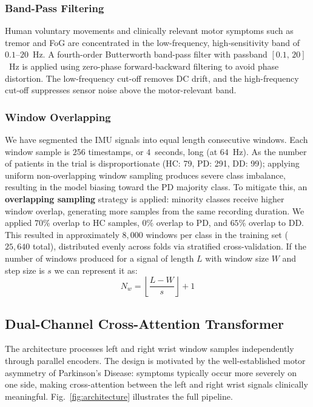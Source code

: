 \documentclass[conference]{IEEEtran}
\begin{document}
\subsubsection{Band-Pass Filtering}
Human voluntary movements and clinically relevant motor symptoms such as tremor and FoG are concentrated in the low-frequency, high-sensitivity band of $0.1$--$20$~Hz. A fourth-order Butterworth band-pass filter with passband $[0.1,\,20]$~Hz is applied using zero-phase forward-backward filtering to avoid phase distortion. The low-frequency cut-off removes DC drift, and the high-frequency cut-off suppresses sensor noise above the motor-relevant band.

\subsubsection{Window Overlapping}
\label{sec:windowing}
We have segmented the IMU signals into equal length consecutive windows. Each window sample is $256$ timestamps, or $4$~seconds, long (at $64$~Hz). As the number of patients in the trial is disproportionate (HC: 79, PD: 291, DD: 99); applying uniform non-overlapping window sampling produces severe class imbalance, resulting in the model biasing toward the PD majority class. To mitigate this, an \textbf{overlapping sampling} strategy is applied: minority classes receive higher window overlap, generating more samples from the same recording duration. We applied $70$\% overlap to HC samples, $0$\% overlap to PD, and $65$\% overlap to DD. This resulted in approximately $8{,}000$ windows per class in the training set ($25{,}640$ total), distributed evenly across folds via stratified cross-validation. If the number of windows produced for a signal of length $L$ with window size $W$ and step size is $s$  we can represent it as:
\begin{equation}
  N_w = \left\lfloor \frac{L - W}{s} \right\rfloor + 1
\end{equation}

\subsection{Dual-Channel Cross-Attention Transformer}
\label{sec:base_model}
The architecture processes left and right wrist window samples independently through parallel encoders. The design is motivated by the well-established motor asymmetry of Parkinson's Disease: symptoms typically occur more severely on one side, making cross-attention between the left and right wrist signals clinically meaningful. Fig.~\ref{fig:architecture} illustrates the full pipeline.
\end{document}
